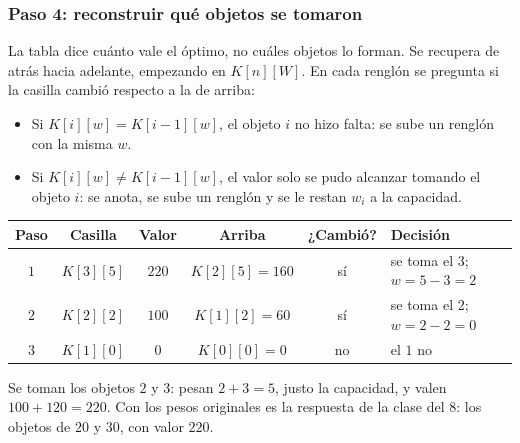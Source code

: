 \documentclass[11pt,letterpaper]{article}
\begin{document}
\subsubsection*{Paso 4: reconstruir qué objetos se tomaron}

La tabla dice cuánto vale el óptimo, no cuáles objetos lo forman. Se
recupera de atrás hacia adelante, empezando en $K[n][W]$. En cada
renglón se pregunta si la casilla cambió respecto a la de arriba:

\begin{itemize}[itemsep=0.3em]
  \item Si $K[i][w] = K[i-1][w]$, el objeto $i$ no hizo falta: se sube
        un renglón con la misma $w$.
  \item Si $K[i][w] \neq K[i-1][w]$, el valor solo se pudo alcanzar
        tomando el objeto $i$: se anota, se sube un renglón y se le
        restan $w_i$ a la capacidad.
\end{itemize}

\begin{center}
\begin{tabular}{cccccl}
  \toprule
  \textbf{Paso} & \textbf{Casilla} & \textbf{Valor}
    & \textbf{Arriba} & \textbf{¿Cambió?} & \textbf{Decisión} \\
  \midrule
  $1$ & $K[3][5]$ & $220$ & $K[2][5] = 160$ & sí
      & se toma el $3$; $w = 5 - 3 = 2$ \\
  $2$ & $K[2][2]$ & $100$ & $K[1][2] = 60$  & sí
      & se toma el $2$; $w = 2 - 2 = 0$ \\
  $3$ & $K[1][0]$ & $0$   & $K[0][0] = 0$   & no
      & el $1$ no \\
  \bottomrule
\end{tabular}
\end{center}

Se toman los objetos $2$ y $3$: pesan $2 + 3 = 5$, justo la capacidad,
y valen $100 + 120 = 220$. Con los pesos originales es la respuesta de
la clase del $8$: los objetos de $20$ y $30$, con valor $220$.

\begin{center}
\end{center}
\end{document}
